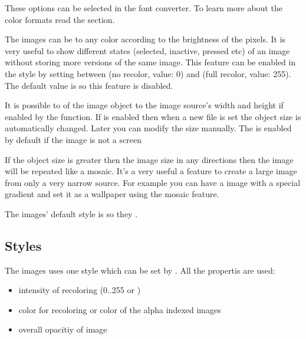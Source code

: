 \documentclass[letterpaper,10pt,english]{sphinxmanual}
\begin{document}
These options can be selected in the font converter. To learn more about the color formats read the {\hyperref[\detokenize{overview/images::doc}]{}} section.

The images can be  to any color according to the brightness of the pixels.
It is very useful to show different states (selected, inactive, pressed etc) of an image without storing more versions of the same image.
This feature can be enabled in the style by setting  between  (no recolor, value: 0) and  (full recolor, value: 255).
The default value is  so this feature is disabled.

It is possible to  of the image object to the image source’s width and height if enabled by the  function.
If  is enabled then when a new file is set the object size is automatically changed. Later you can modify the size manually. The  is enabled by default if the image is not a screen

If the object size is greater then the image size in any directions then the image will be repeated like a mosaic.
It’s a very useful a feature to create a large image from only a very narrow source.
For example you can have a  image with a special gradient and set it as a wallpaper using the mosaic feature.

The images’ default style is  so they .


\subsection{Styles}
\label{\detokenize{object-types/img:styles}}
The images uses one style which can be set by . All the  propertis are used:
\begin{itemize}
\item {} 
 intensity of recoloring (0..255 or )

\item {} 
 color for recoloring or color of the alpha indexed images

\item {} 
 overall opacitiy of image

\end{itemize}
\end{document}
